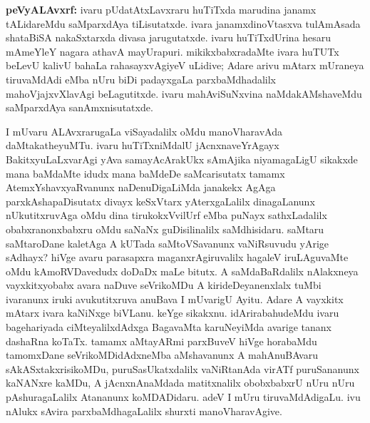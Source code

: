 {\large\textbf{peVyALAvxrf:}} ivaru pUdatAtxLavxraru huTiTxda marudina janamx tALidareMdu saMparxdAya tiLisutatxde. ivara janamxdinoVtasxva tulAmAsada shataBiSA nakaSxtarxda divasa jarugutatxde. ivaru huTiTxdUrina hesaru mAmeYleY nagara athavA mayUrapuri. mikikxbabxradaMte ivara huTUTx beLevU kalivU bahaLa rahasayxvAgiyeV uLidive; Adare arivu mAtarx mUraneya tiruvaMdAdi eMba nUru biDi padayxgaLa parxbaMdhadalilx mahoVjajxvXlavAgi beLagutitxde. ivaru mahAviSuNxvina naMdakAMshaveMdu saMparxdAya sanAmxnisutatxde.

I mUvaru ALAvxrarugaLa viSayadalilx oMdu manoVharavAda daMtakatheyuMTu. ivaru huTiTxniMdalU jAcnxnaveYrAgayx BakitxyuLaLxvarAgi yAva samayA\-cArakUkx sAmAjika niyamagaLigU sikakxde mana baMdaMte idudx mana baMdeDe saMcarisutatx tamamx AtemxYshavxyaRvanunx naDenuDigaLiMda janakekx AgAga parxkAshapaDisutatx divayx keSxVtarx yAterxgaLalilx dina\-gaLanunx nUkutitxruvAga oMdu dina tirukokxVvilUrf eMba puNayx sathxLadalilx obabxra\-nonxbabxru oMdu saNaNx guDisilinalilx saMdhisidaru. saMtaru saMtaroDane kaletAga A kUTada saMtoVSavanunx vaNiRsuvudu yArige sAdhayx? hiVge avaru parasapxra maganx\-rAgiruvalilx hagaleV iruLAguvaMte oMdu kAmoRVDavedudx doDaDx maLe bitutx. A saMdaBaRdalilx nAlakxneya vayxkitxyobabx avara naDuve seVrikoMDu A kirideDe\-yanenxlalx tuMbi ivaranunx iruki avukutitxruva anuBava I mUvarigU Ayitu. Adare A vayxkitx mAtarx ivara kaNiNxge biVLanu. keYge sikakxnu. idArirabahudeMdu ivaru bage\-hariyada ciMteyalilxdAdxga BagavaMta karuNeyiMda avarige tananx dashaRna koTaTx. tamamx aMta\-yARmi parxBuveV hiVge horabaMdu tamomxDane seVrikoMDidAdxneMba aMshavanunx A mahAnuBAvaru sAkASxtakxrisikoMDu, puruSasUkatxdalilx vaNiRtanAda virATf puruSa\-nanunx kaNANxre kaMDu, A jAcnxnAnaMdada matitxnalilx obobxbabxrU nUru nUru pAshura\-gaLalilx Atananunx koMDADidaru. adeV I mUru tiruvaMdAdigaLu. ivu nAlukx sAvira parxbaMdhagaLalilx shurxti manoVharavAgive.

